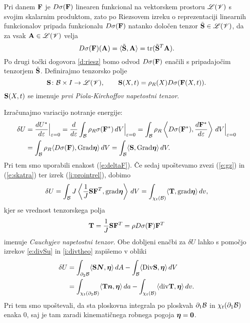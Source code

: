Pri danem $\mathbf F$ je $D\sigma(\mathbf F)$ linearen funkcional
na vektorskem prostoru $\mathscr L(\mathscr V)$ s svojim skalarnim produktom, zato po Riezsovem izreku
o reprezentaciji linearnih funkcionalov pripada funkcionalu $D\sigma(\mathbf F)$ natanko
določen tenzor $\tilde{\mathbf S}\in\mathscr L(\mathscr V)$, da za vsak $\mathbf A\in\mathscr L(\mathscr V)$ velja
\[ D\sigma(\mathbf F)(\mathbf A)=\langle\tilde{\mathbf S},\mathbf A\rangle=\mathrm{tr}(\tilde{\mathbf S}^{T}\mathbf A). \]
Po drugi točki dogovora \ref{d:riesz}
bomo odvod $D\sigma(\mathbf F)$ enačili s pripadajočim tenzorjem $\tilde{\mathbf S}$.
Definirajmo tenzorsko polje
\begin{equation} \label{e:piola}
	\ten{S}\colon \B\times I\to\L(\V),\qquad
	\ten{S}(X,t)=\rho_R(X)D\sigma(\ten{F}(X,t)).%
\end{equation}
$\mathbf S(X,t)$ se imenuje \emph{prvi Piola-Kirchoffov napetostni tenzor}.

Izračunajmo variacijo notranje energije:
\begin{align*} 
	\delta U &=\frac{dU^*}{d\varepsilon}\Big|_{\varepsilon=0}=\frac{d}{d\varepsilon}
	\int_{\mathcal B}\rho_R \sigma(\mathbf F^*)\,dV \Big|_{\varepsilon=0} =
	\int_{\mathcal B}\rho_R \left< D\sigma(\mathbf F^*),\frac{d\mathbf F^*}{d\varepsilon}\right>\,dV \Big|_{\varepsilon=0} \\
	&= \int_{\mathcal B}\rho_R \langle D\sigma(\mathbf F),\mathrm{Grad}\boldsymbol \eta\rangle\,dV
	=\int_{\mathcal B}\langle\mathbf S,\mathrm{Grad}\boldsymbol \eta\rangle\,dV.
\end{align*}
Pri tem smo uporabili enakost (\ref{e:deltaF}). Če sedaj upoštevamo zvezi (\ref{e:gz}) in
(\ref{e:skatra}) ter izrek (\ref{i:prointrel}), dobimo
\begin{align*} 
	\delta U = \int_{\mathcal B}J\left<\frac{1}{J}\mathbf S\mathbf F^{T},\mathrm{grad}\boldsymbol \eta\right>\,dV =
	\int_{\chi_t(\mathcal B)}\langle\mathbf T,\mathrm{grad}\boldsymbol \eta\rangle\,dv,
\end{align*}
kjer se vrednost tenzorskega polja
\begin{equation} \label{e:napetostni}
	\mathbf T=\frac{1}{J}\mathbf S\mathbf F^{T}=\rho D\sigma(\mathbf F)\mathbf F^{T}
\end{equation}
imenuje \emph{Cauchyjev napetostni tenzor}. Obe dobljeni enačbi za $\delta U$ lahko
s pomočjo izrekov \ref{e:divSu} in \ref{i:divtheo} zapišemo v obliki
\begin{align}
	\delta U &= \int_{\partial_2\mathcal B}\langle\mathbf S\boldsymbol N,\boldsymbol \eta\rangle\,dA-
	\int_{\mathcal B}\langle\mathrm {Div}\mathbf S,\boldsymbol \eta\rangle\,dV \label{e:vapoesr} \\
	&= \int_{\chi_t(\partial_2\mathcal B)}\langle\mathbf T\boldsymbol n,\boldsymbol \eta\rangle\,da-
	\int_{\chi_t(\mathcal B)}\langle\mathrm{div}\mathbf T,\boldsymbol \eta\rangle\,dv. \label{e:vapoesp}
\end{align}
Pri tem smo upoštevali, da sta ploskovna integrala po ploskvah $\partial_1\mathcal B$ in
$\chi_t(\partial_1\mathcal B)$ enaka 0, saj je tam zaradi kinematičnega robnega pogoja $\boldsymbol \eta=\boldsymbol 0$.

